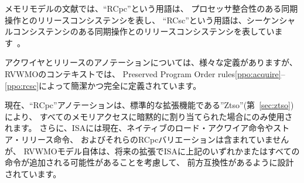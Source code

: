 \begin{commentary}
\begin{comment}
  In the memory model literature, the term ``RCpc'' stands for release consistency with processor-consistent synchronization operations, and the term ``RCsc'' stands for release consistency with sequentially-consistent synchronization operations~\cite{Gharachorloo90memoryconsistency}.
\end{comment}
  メモリモデルの文献では、``RCpc''という用語は、
プロセッサ整合性のある同期操作とのリリースコンシステンシを表し、
``RCsc''という用語は、シーケンシャルコンシステンシのある同期操作とのリリースコンシステンシを表しています~\cite{Gharachorloo90memoryconsistency}。

\begin{comment}
  While there are many different definitions for acquire and release annotations in the literature, in the context of RVWMO these terms are concisely and completely defined by Preserved Program Order rules \ref{ppo:acquire}--\ref{ppo:rcsc}.
\end{comment}
  アクワイヤとリリースのアノテーションについては、様々な定義がありますが、RVWMOのコンテキストでは、
Preserved Program Order rules\ref{ppo:acquire}--\ref{ppo:rcsc}によって簡潔かつ完全に定義されています。

\begin{comment}
  ``RCpc'' annotations are currently only used when implicitly assigned to every memory access per the standard extension ``Ztso'' (Chapter~\ref{sec:ztso}).  Furthermore, although the ISA does not currently contain native load-acquire or store-release instructions, nor RCpc variants thereof, the RVWMO model itself is designed to be forwards-compatible with the potential addition of any or all of the above into the ISA in a future extension.
\end{comment}
  現在、``RCpc''アノテーションは、標準的な拡張機能である''Ztso''(第~\ref{sec:ztso})により、
すべてのメモリアクセスに暗黙的に割り当てられた場合にのみ使用されます。
さらに、ISAには現在、ネイティブのロード・アクワイア命令やストア・リリース命令、
およびそれらのRCpcバリエーションは含まれていませんが、
RVWMOモデル自体は、将来の拡張でISAに上記のいずれかまたはすべての命令が追加される可能性があることを考慮して、
前方互換性があるように設計されています。
\end{commentary}


\begin{comment}
\subsection*{Syntactic Dependencies}
\end{comment}

